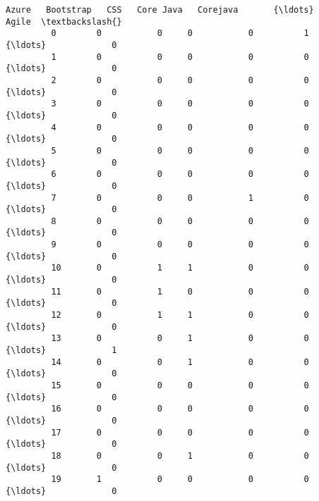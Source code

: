 \documentclass[11pt]{article}
\begin{document}
\begin{Verbatim}[commandchars=\\\{\}]
              Azure   Bootstrap   CSS   Core Java   Corejava       {\ldots}         Agile  \textbackslash{}
         0        0           0     0           0          1       {\ldots}             0   
         1        0           0     0           0          0       {\ldots}             0   
         2        0           0     0           0          0       {\ldots}             0   
         3        0           0     0           0          0       {\ldots}             0   
         4        0           0     0           0          0       {\ldots}             0   
         5        0           0     0           0          0       {\ldots}             0   
         6        0           0     0           0          0       {\ldots}             0   
         7        0           0     0           1          0       {\ldots}             0   
         8        0           0     0           0          0       {\ldots}             0   
         9        0           0     0           0          0       {\ldots}             0   
         10       0           1     1           0          0       {\ldots}             0   
         11       0           1     0           0          0       {\ldots}             0   
         12       0           1     1           0          0       {\ldots}             0   
         13       0           0     1           0          0       {\ldots}             1   
         14       0           0     1           0          0       {\ldots}             0   
         15       0           0     0           0          0       {\ldots}             0   
         16       0           0     0           0          0       {\ldots}             0   
         17       0           0     0           0          0       {\ldots}             0   
         18       0           0     1           0          0       {\ldots}             0   
         19       1           0     0           0          0       {\ldots}             0   
         

\end{Verbatim}
\end{document}
